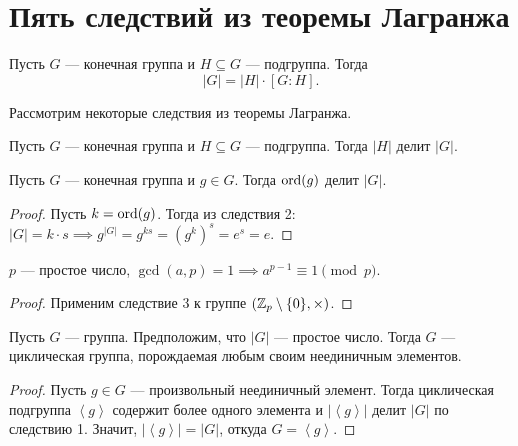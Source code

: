 \section{Пять следствий из теоремы Лагранжа}

\begin{theorem}
    Пусть $G$ --- конечная группа и $H \subseteq G$ --- подгруппа. Тогда
    \begin{equation*}
        |G| = |H| \cdot \left[G : H\right]
    .\end{equation*}
\end{theorem}

Рассмотрим некоторые следствия из теоремы Лагранжа.

\begin{corollary}
    Пусть $G$ --- конечная группа и $H \subseteq G$ --- подгруппа. Тогда $|H|$ делит $|G|$.
\end{corollary}

\begin{corollary}
    Пусть $G$ --- конечная группа и $g \in G$. Тогда $\operatorname{\mathop{\mathrm{ord}}}(g)$ делит $|G|$.
\end{corollary}

\begin{proof}
    Пусть $k = \operatorname{\mathop{\mathrm{ord}}}(g)$. Тогда из следствия 2: $|G| = k \cdot s \implies g^{|G|} = g^{ks} = \left(g^{k}\right)^{s} = e^{s} = e$.
\end{proof}

\begin{corollary}
    $p$ --- простое число, $\gcd(a, p) = 1 \implies a^{p - 1} \equiv 1 \pmod{p}$.
\end{corollary}

\begin{proof}
    Применим следствие 3 к группе $(\mathbb{Z}_p \setminus \{0\}, \times)$.
\end{proof}

\begin{corollary}
    Пусть $G$ --- группа. Предположим, что $|G|$ --- простое число. Тогда $G$ --- циклическая группа, порождаемая любым своим неединичным элементов.
\end{corollary}

\begin{proof}
    Пусть $g \in G$ --- произвольный неединичный элемент. Тогда циклическая подгруппа $\left< g \right>$ содержит более одного элемента и $\left|\left< g \right>\right|$ делит $|G|$ по следствию 1. Значит, $\left|\left< g \right>\right| = |G|$, откуда $G = \left< g \right>$.
\end{proof}
